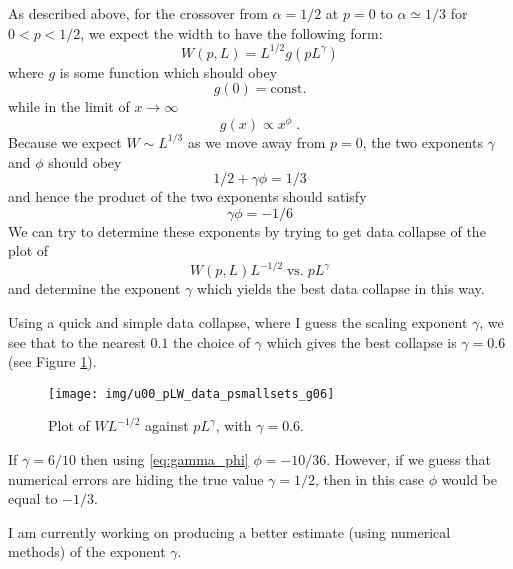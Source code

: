 \documentclass[a4paper,10pt]{article}
\newcommand{\fref}[1]{Figure \ref{#1}}
\begin{document}
As described above, for the crossover from $\alpha = 1/2$ at $p = 0$ to $\alpha \simeq 1/3$ for $0 < p  < 1/2$, we expect the width to have the following form:
\begin{equation}
  W(p,L) = L^{1/2} g(pL^\gamma)
\end{equation}
where $g$ is some function which should obey
\begin{equation}
  g(0)= \mbox{const.}
\end{equation}
while in the limit of $x \to \infty$
\begin{equation}
  g(x) \propto x^\phi \;.
\end{equation}
Because we expect $W \sim L^{1/3}$ as we move away from $p=0$, the two exponents $\gamma$ and $\phi$ should obey
\begin{equation}
  1/2 +\gamma \phi = 1/3
\end{equation}
and hence the product of the two exponents should satisfy
\begin{equation}\label{eq:gamma_phi}
  \gamma \phi = -1/6
\end{equation}
We can try to determine these exponents by trying to get data collapse of the plot of
\begin{equation}
  W(p,L)L^{-1/2} \; \mbox{vs.} \; pL^\gamma
\end{equation}
and determine the exponent $\gamma$ which yields the best data collapse in this way.

Using a quick and simple data collapse, where I guess the scaling exponent $\gamma$, we see that to the nearest $0.1$ the choice of $\gamma$ which gives the best collapse is $\gamma = 0.6$ (see \fref{fig:pLW_g06}).
\begin{figure}
  \centering
  \texttt{[image: img/u00\_pLW\_data\_psmallsets\_g06]}
  \caption{Plot of $WL^{-1/2}$ against $pL^\gamma$, with $\gamma = 0.6$.}
  \label{fig:pLW_g06}
\end{figure}

If $\gamma = 6/10$ then using \eqref{eq:gamma_phi} $\phi = -10/36$. However, if we guess that numerical errors are hiding the true value $\gamma = 1/2$, then in this case $\phi$ would be equal to $-1/3$.

I am currently working on producing a better estimate (using numerical methods) of the exponent $\gamma$.


\newpage
\end{document}
